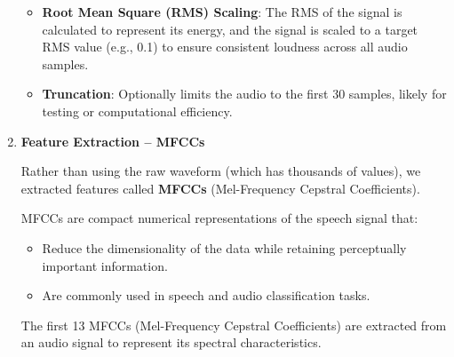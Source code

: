\documentclass{article}
\begin{document}
\begin{enumerate}
\begin{itemize}
        \item \textbf{Root Mean Square (RMS) Scaling}: The RMS of the signal is calculated to represent its energy, and the signal is scaled to a target RMS value (e.g., 0.1) to ensure consistent loudness across all audio samples.
        
        \item \textbf{Truncation}: Optionally limits the audio to the first 30 samples, likely for testing or computational efficiency.
    \end{itemize}
    
    \item \textbf{Feature Extraction – MFCCs}

    Rather than using the raw waveform (which has thousands of values), we extracted features called \textbf{MFCCs} (Mel-Frequency Cepstral Coefficients).
    
    MFCCs are compact numerical representations of the speech signal that:
    \begin{itemize}
        \item Reduce the dimensionality of the data while retaining perceptually important information. 
        \item Are commonly used in speech and audio classification tasks.
    \end{itemize}
    
    The first 13 MFCCs (Mel-Frequency Cepstral Coefficients) are extracted from an audio signal to represent its spectral characteristics. 
    

\end{enumerate}
\end{document}
